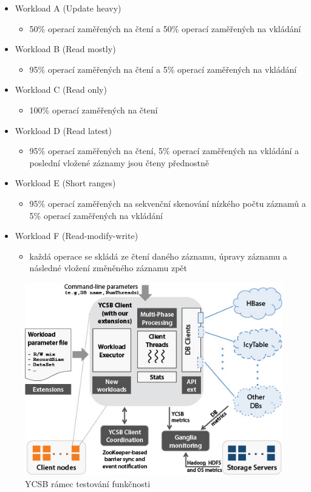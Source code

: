 \documentclass[czech,master,dept460,male,csharp,cpdeclaration]{diploma}
\begin{document}
	\begin{itemize} \label{lab-workloads}
		\item Workload A (Update heavy)
		\begin{itemize}
			\item 50\% operací zaměřených na čtení a 50\% operací zaměřených na vkládání
		\end{itemize}
		\item Workload B (Read mostly)
		\begin{itemize}
			\item 95\% operací zaměřených na čtení a 5\% operací zaměřených na vkládání
		\end{itemize}
		\item Workload C (Read only)
		\begin{itemize}
			\item 100\% operací zaměřených na čtení
		\end{itemize}
		\item Workload D (Read latest)
		\begin{itemize}
			\item 95\% operací zaměřených na čtení, 5\% operací zaměřených na vkládání a poslední vložené záznamy jsou čteny přednostně
		\end{itemize}
		\item Workload E (Short ranges)
		\begin{itemize}
			\item 95\% operací zaměřených na sekvenční skenování nízkého počtu záznamů a 5\% operací zaměřených na vkládání
		\end{itemize}
		\item Workload F (Read-modify-write)
		\begin{itemize}
			\item každá operace se skládá ze čtení daného záznamu, úpravy záznamu a následné vložení změněného záznamu zpět
		\end{itemize}
	\end{itemize}

	\begin{figure}
		\centering
		\includegraphics[scale=0.7]{Data/ycsb-1.jpg}
		\caption{YCSB rámec testování funkčnosti \cite{ycsb-parallel-data-lab}\label{ycsb-blok-schema}}
	\end{figure}
\end{document}
